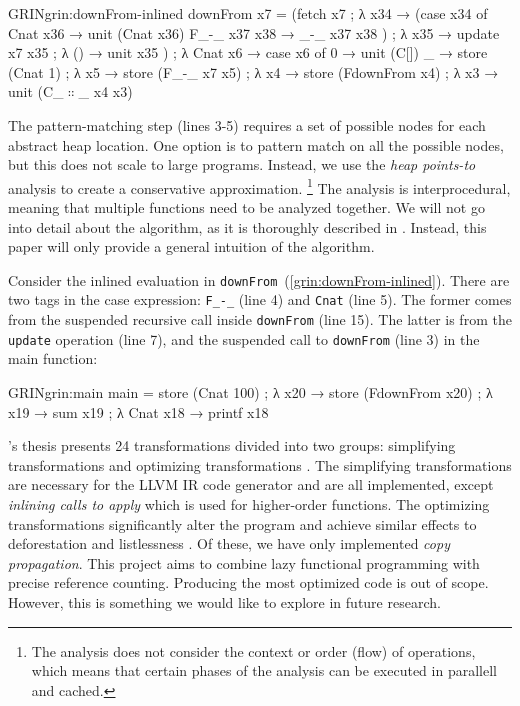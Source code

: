 \documentclass[9pt, twocolumn]{article}
\newcommand{\refp}[1]{(\ref{#1})}
\begin{document}
\begin{typewriter}[left]{GRIN}{grin:downFrom-inlined}
downFrom x7 =
  (fetch x7 ; λ x34 →
   (case x34 of
      Cnat x36 → unit (Cnat x36)
      F_-_ x37 x38 → _-_ x37 x38
   ) ; λ x35 →
   update x7 x35 ; λ () →
   unit x35
  ) ; λ Cnat x6 →
  case x6 of
    0 → unit (C[])
    _ →
      store (Cnat 1) ; λ x5 →
      store (F_-_ x7 x5) ; λ x4 →
      store (FdownFrom x4) ; λ x3 →
      unit (C_$∷$_ x4 x3)
\end{typewriter}
The pattern-matching step (lines 3-5) requires a set of possible nodes for each abstract heap location.
One option is to pattern match on all the possible nodes, but this does not scale to large programs.
Instead, we use the \emph{heap points-to} analysis \citep{johnsson1991} to create a conservative approximation.%
\footnote{%
The analysis does not consider the context or order (flow) of operations, which means that certain phases of the analysis can be executed in parallell and cached. 

}
The analysis is interprocedural, meaning that multiple functions need to be analyzed together.
We will not go into detail about the algorithm, as it is thoroughly described in \citep{boquist1996, johnsson1991}. 
Instead, this paper will only provide a general intuition of the algorithm.

Consider the inlined evaluation in \mbox{\lstinline{downFrom} \refp{grin:downFrom-inlined}}.
There are two tags in the case expression: \lstinline{F_-_} (line 4) and \lstinline{Cnat} (line 5). 
The former comes from the suspended recursive call inside \lstinline{downFrom} (line 15). 
The latter is from the \lstinline{update} operation (line 7), and the suspended call to \lstinline{downFrom} (line 3) in the main function:

\begin{typewriter}[left]{GRIN}{grin:main}
main =
  store (Cnat 100) ; λ x20 →
  store (FdownFrom x20) ; λ x19 →
  sum x19 ; λ Cnat x18 →
  printf x18
\end{typewriter}

\citeauthor{boquist1999}'s thesis presents 24 transformations divided into two groups: simplifying transformations and optimizing 
transformations \citep{boquist1999}. 
The simplifying transformations are necessary for the LLVM IR code generator and are all implemented, except \emph{inlining calls to apply}
which is used for higher-order functions. 
The optimizing transformations significantly alter the program and achieve similar effects to deforestation \citep{wadler1988} and listlessness \citep{wadler1984}.
Of these, we have only implemented \emph{copy propagation}.
This project aims to combine lazy functional programming with precise reference counting. 
Producing the most optimized code is out of scope. 
However, this is something we would like to explore in future research.
\end{document}
